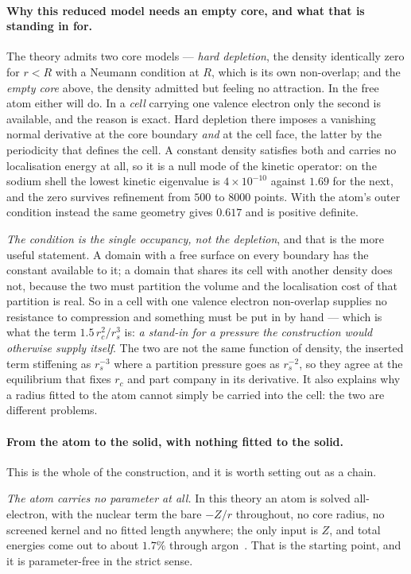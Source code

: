\documentclass[11pt]{article}
\begin{document}
\paragraph{Why this reduced model needs an empty core, and what that is standing in for.} The theory
admits two core models --- \emph{hard depletion}, the density identically zero for $r<R$ with a
Neumann condition at $R$, which is its own non-overlap; and the \emph{empty core} above, the density
admitted but feeling no attraction. In the free atom either will do. In a \emph{cell} carrying one
valence electron only the second is available, and the reason is exact. Hard depletion there imposes
a vanishing normal derivative at the core boundary \emph{and} at the cell face, the latter by the
periodicity that defines the cell. A constant density satisfies both and carries no localisation
energy at all, so it is a null mode of the kinetic operator: on the sodium shell the lowest kinetic
eigenvalue is $4\times10^{-10}$ against $1.69$ for the next, and the zero survives refinement from
$500$ to $8000$ points. With the atom's outer condition instead the same geometry gives $0.617$ and
is positive definite.

\emph{The condition is the single occupancy, not the depletion}, and that is the more useful
statement. A domain with a free surface on every boundary has the constant available to it; a domain
that shares its cell with another density does not, because the two must partition the volume and
the localisation cost of that partition is real. So in a cell with one valence electron non-overlap
supplies no resistance to compression and something must be put in by hand --- which is what the
term $1.5\,r_c^2/r_s^3$ is: \emph{a stand-in for a pressure the construction would otherwise supply
itself}. The two are not the same function of density, the inserted term stiffening as $r_s^{-3}$
where a partition pressure goes as $r_s^{-2}$, so they agree at the equilibrium that fixes $r_c$ and
part company in its derivative. It also explains why a radius fitted to the atom cannot simply be
carried into the cell: the two are different problems.

\paragraph{From the atom to the solid, with nothing fitted to the solid.}\label{sec:core} This is
the whole of the construction, and it is worth setting out as a chain.

\emph{The atom carries no parameter at all.} In this theory an atom is solved all-electron, with the
nuclear term the bare $-Z/r$ throughout, no core radius, no screened kernel and no fitted length
anywhere; the only input is $Z$, and total energies come out to about $1.7\%$ through
argon~\cite{atoms}. That is the starting point, and it is parameter-free in the strict sense.
\end{document}
